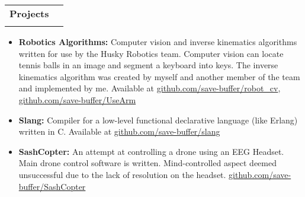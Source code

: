 \documentclass[letterpaper,11pt]{article}
\makeatletter
\newcommand{\resumeItem}[2]{
\vspace{-3pt}
\item\small{
    \textbf{#1}{\textbf{:} #2 \vspace{-2pt}}
  }
}
\newcommand{\resumeSubheading}[4]{
  \vspace{4pt}
  \begin{tabular*}{0.97\textwidth}{l@{\extracolsep{\fill}}r}
    \textbf{#1} & #2 \\
    {\small#3} & {\small #4} \\
  \end{tabular*}\vspace{-5pt}
}
\newcommand{\resumeSubHeadingListEnd}{}
\newcommand{\resumeItemListStart}{\vspace{3pt}\begin{itemize}}
\newcommand{\resumeItemListEnd}{\end{itemize}\vspace{-5pt}}
\makeatother
\begin{document}
\resumeSubheading
{\color{lightblue}Projects}{}
{}{}
\vspace{-8pt}
\resumeItemListStart
\resumeItem{Robotics Algorithms}
{Computer vision and inverse kinematics algorithms written for use by the Husky Robotics
  team. Computer vision can locate tennis balls in an image and segment a keyboard into
  keys. The inverse kinematics algorithm was created by myself and another member of the
  team and implemented by me. Available at
  \href{https://github.com/save-buffer/robot\_cv}{github.com/save-buffer/robot\_cv},
  \href{https://github.com/save-buffer/UseArm}{github.com/save-buffer/UseArm}}
\resumeItem{Slang}
{Compiler for a low-level functional declarative language (like Erlang) written in C.
Available at \href{https://github.com/save-buffer/slang}{github.com/save-buffer/slang}}
\resumeItem{SashCopter}
{An attempt at controlling a drone using an EEG Headset. Main drone control software is
  written. Mind-controlled aspect deemed unsuccessful due to the lack of resolution on
  the headset.  
  \href{https://www.github.com/save-buffer/SashCopter}{github.com/save-buffer/SashCopter}}
\resumeItemListEnd
\resumeSubHeadingListEnd
\end{document}
